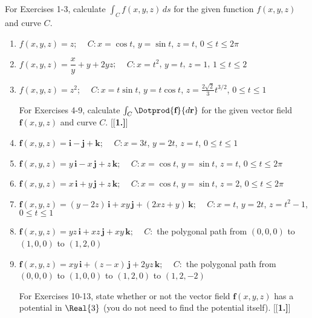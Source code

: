 \section*{}\begin{multicols}{2}\columnseprule 1pt \columnsep 25pt
\par\noindent For Exercises 1-3, calculate $\int_C f(x,y,z)\,ds$ for the given function $f(x,y,z)$ and
curve $C$.
\begin{enumerate}[\bfseries 1.]
 \item $f(x,y,z)=z$; $\quad C: x=\cos t$, $y=\sin t$, $z=t$, $0 \le t \le 2\pi$
 \item $f(x,y,z)=\dfrac{x}{y} + y + 2yz$; $\quad C: x=t^2$, $y=t$, $z=1$, $1 \le t \le 2$
 \item $f(x,y,z)=z^2$; $\quad C: x=t\sin t$, $y=t\cos t$, $z=\frac{2\sqrt{2}}{3}t^{3/2}$, $0 \le t \le 1$
\par\noindent For Exercises 4-9, calculate $\int_C \Dotprod{\textbf{f}}{d\textbf{r}}$ for the given vector
 field $\textbf{f}(x,y,z)$ and curve $C$.
[{[\bfseries 1.]}]
 \item $\textbf{f}(x,y,z) = \textbf{i} - \textbf{j} + \textbf{k}$; $\quad C: x=3t$, $y=2t$, $z=t$, $0 \le t \le 1$
 \item $\textbf{f}(x,y,z) = y\,\textbf{i} - x\,\textbf{j} + z\,\textbf{k}$; $\quad C: x=\cos t$, $y=\sin t$, $z=t$,
  $0 \le t \le 2\pi$
 \item $\textbf{f}(x,y,z) = x\,\textbf{i} + y\,\textbf{j} + z\,\textbf{k}$; $\quad C: x=\cos t$, $y=\sin t$, $z=2$,
  $0 \le t \le 2\pi$
 \item $\textbf{f}(x,y,z) = (y-2z)\,\textbf{i} + xy\,\textbf{j} + (2xz+y)\,\textbf{k}$; $\quad C: x=t$, $y=2t$,
  $z = t^2 - 1$, $0 \le t \le 1$
 \item $\textbf{f}(x,y,z) = yz\,\textbf{i} + xz\,\textbf{j} + xy\,\textbf{k}$; $\quad C:$ the polygonal path from
  $(0,0,0)$ to $(1,0,0)$ to $(1,2,0)$
 \item $\textbf{f}(x,y,z) = xy\,\textbf{i} + (z-x)\,\textbf{j} + 2yz\,\textbf{k}$; $\quad C:$ the polygonal path from
  $(0,0,0)$ to $(1,0,0)$ to $(1,2,0)$ to $(1,2,-2)$
\par\noindent For Exercises 10-13, state whether or not the vector field $\textbf{f}(x,y,z)$ has a potential in
$\Real{3}$ (you do not need to find the potential itself).
[{[\bfseries 1.]}]
 \begin{multicols}{2}

\end{multicols}
\end{enumerate}
\end{multicols}
